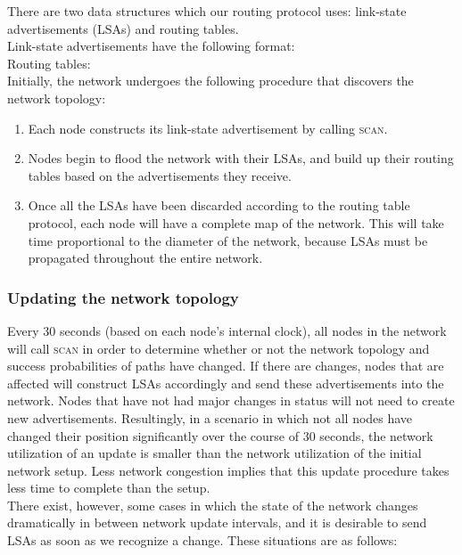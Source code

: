 \documentclass[letterpaper]{article}
\begin{document}
\noindent There are two data structures which our routing protocol uses: link-state advertisements (LSAs)
and routing tables. 
\\

\noindent Link-state advertisements have the following format:
\\

\noindent Routing tables:
\\

\noindent Initially, the network undergoes the following procedure that discovers the network topology:

\begin{enumerate}
  \item Each node constructs its link-state advertisement by calling \textsc{scan}. 
  \item Nodes begin to flood the network with their LSAs, and build up their routing tables based on
  the advertisements they receive.
  \item Once all the LSAs have been discarded according to the routing table protocol, each node will have
  a complete map of the network. This will take time proportional to the diameter of the network, because
  LSAs must be propagated throughout the entire network.
\end{enumerate}

\subsubsection{Updating the network topology}

Every 30 seconds (based on each node's internal clock), all nodes in the network will call \textsc{scan} in
order to determine whether or not the network topology and success probabilities of paths have changed.
If there are changes, nodes that are affected will construct LSAs accordingly and send these
advertisements into the network. Nodes that have not had major changes in status will not need to create
new advertisements. Resultingly, in a scenario in which not all nodes have changed their position
significantly over the course of 30 seconds, the network utilization of an update is smaller than the
network utilization of the initial network setup. Less network congestion implies that this update
procedure takes less time to complete than the setup.
\\

\noindent There exist, however, some cases in which the state of the network changes dramatically in 
between network update intervals, and it is desirable to send LSAs as soon as we recognize a change.
These situations are as follows:
\end{document}
